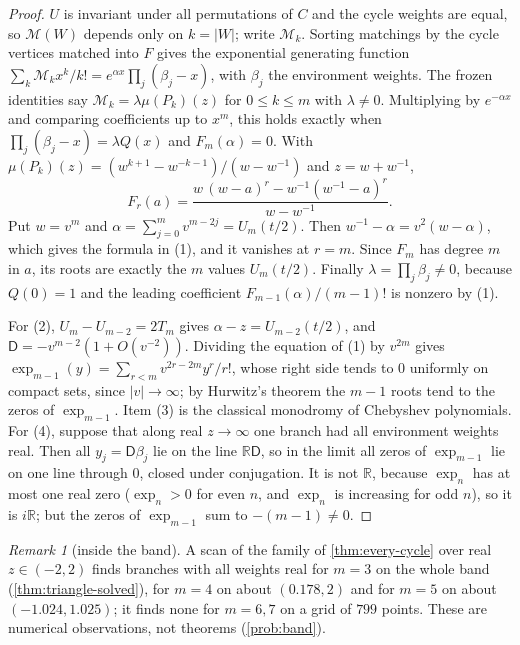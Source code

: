 \documentclass[11pt]{amsart}
\theoremstyle{plain}
\theoremstyle{definition}
\theoremstyle{remark}
\newtheorem*{remark*}{Remark}
\numberwithin{equation}{section}
\newcommand{\RR}{\mathbb{R}}
\newcommand{\Mpot}{\mathcal{M}}           %
\begin{document}
\begin{proof}
$U$ is invariant under all permutations of $C$ and the cycle weights are equal, so $\Mpot(W)$ depends only on $k=|W|$; write $\Mpot_k$. Sorting matchings by the cycle vertices matched into $F$ gives the exponential generating function $\sum_k\Mpot_kx^{k}/k!=e^{\alpha x}\prod_j(\beta_j-x)$, with $\beta_j$ the environment weights. The frozen identities say $\Mpot_k=\lambda\mu(P_k)(z)$ for $0\le k\le m$ with $\lambda\neq0$. Multiplying by $e^{-\alpha x}$ and comparing coefficients up to $x^m$, this holds exactly when $\prod_j(\beta_j-x)=\lambda Q(x)$ and $F_m(\alpha)=0$. With $\mu(P_k)(z)=(w^{k+1}-w^{-k-1})/(w-w^{-1})$ and $z=w+w^{-1}$,
\[
F_r(a)=\frac{w\,(w-a)^{r}-w^{-1}(w^{-1}-a)^{r}}{w-w^{-1}}.
\]
Put $w=v^{m}$ and $\alpha=\sum_{j=0}^{m}v^{m-2j}=U_m(t/2)$. Then $w^{-1}-\alpha=v^{2}(w-\alpha)$, which gives the formula in (1), and it vanishes at $r=m$. Since $F_m$ has degree $m$ in $a$, its roots are exactly the $m$ values $U_m(t/2)$. Finally $\lambda=\prod_j\beta_j\neq0$, because $Q(0)=1$ and the leading coefficient $F_{m-1}(\alpha)/(m-1)!$ is nonzero by (1).

For (2), $U_m-U_{m-2}=2T_m$ gives $\alpha-z=U_{m-2}(t/2)$, and $\mathsf D=-v^{m-2}(1+O(v^{-2}))$. Dividing the equation of (1) by $v^{2m}$ gives $\exp_{m-1}(y)=\sum_{r<m}v^{2r-2m}y^{r}/r!$, whose right side tends to $0$ uniformly on compact sets, since $|v|\to\infty$; by Hurwitz's theorem the $m-1$ roots tend to the zeros of $\exp_{m-1}$. Item (3) is the classical monodromy of Chebyshev polynomials. For (4), suppose that along real $z\to\infty$ one branch had all environment weights real. Then all $y_j=\mathsf D\beta_j$ lie on the line $\RR\mathsf D$, so in the limit all zeros of $\exp_{m-1}$ lie on one line through $0$, closed under conjugation. It is not $\RR$, because $\exp_n$ has at most one real zero ($\exp_n>0$ for even $n$, and $\exp_n$ is increasing for odd $n$), so it is $i\RR$; but the zeros of $\exp_{m-1}$ sum to $-(m-1)\neq0$.
\end{proof}

\begin{remark*}[inside the band]
A scan of the family of \cref{thm:every-cycle} over real $z\in(-2,2)$ finds branches with all weights real for $m=3$ on the whole band (\cref{thm:triangle-solved}), for $m=4$ on about $(0.178,2)$ and for $m=5$ on about $(-1.024,1.025)$; it finds none for $m=6,7$ on a grid of $799$ points. These are numerical observations, not theorems (\cref{prob:band}).
\end{remark*}
\end{document}
